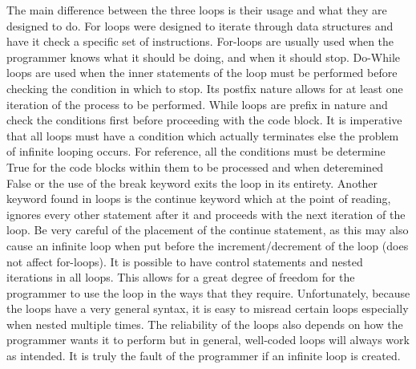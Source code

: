 \documentclass[12pt]{article}
\begin{document}
The main difference between the three loops is their usage and what they are designed to do. For loops were designed to iterate through data structures and have it check a specific set of instructions. For-loops are usually used when the programmer knows what it should be doing, and when it should stop. Do-While loops are used when the inner statements of the loop must be performed before checking the condition in which to stop. Its postfix nature allows for at least one iteration of the process to be performed. While loops are prefix in nature and check the conditions first before proceeding with the code block. It is imperative that all loops must have a condition which actually terminates else the problem of infinite looping occurs. For reference, all the conditions must be determine True for the code blocks within them to be processed and when deteremined False or the use of the break keyword exits the loop in its entirety. Another keyword found in loops is the continue keyword which at the point of reading, ignores every other statement after it and proceeds with the next iteration of the loop. Be very careful of the placement of the continue statement, as this may also cause an infinite loop when put before the increment/decrement of the loop (does not affect for-loops). It is possible to have control statements and nested iterations in all loops. This allows for a great degree of freedom for the programmer to use the loop in the ways that they require. Unfortunately, because the loops have a very general syntax, it is easy to misread certain loops especially when nested multiple times. The reliability of the loops also depends on how the programmer wants it to perform but in general, well-coded loops will always work as intended. It is truly the fault of the programmer if an infinite loop is created.



\iffalse



%
%
%
\end{document}
